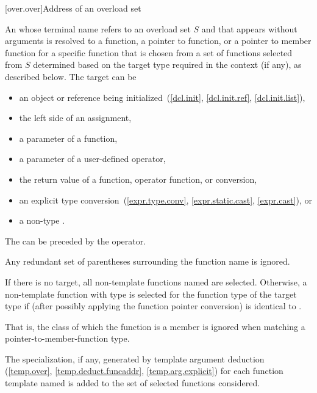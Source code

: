 %

[over.over]{Address of an overload set}%
%

\pnum
An 
whose terminal name refers to an overload set $S$ and
that appears without arguments
is resolved to
a function,
a pointer to function, or
a pointer to member function
for a specific function
that is chosen from a set of functions selected from $S$
determined based on the target type required in the context (if any),
as described below.
The target can be
\begin{itemize}
\item
an object or reference being initialized~(\ref{dcl.init}, \ref{dcl.init.ref},
\ref{dcl.init.list}),
\item
the left side of an assignment,
\item
a parameter of a function,
\item
a parameter of a user-defined operator,
\item
the return value of a function, operator function, or conversion,
\item
an explicit type conversion~(\ref{expr.type.conv}, \ref{expr.static.cast},
\ref{expr.cast}), or
\item
a non-type
.
\end{itemize}
The  can be preceded by the \tcode{\&} operator.
\begin{note}
Any redundant set of parentheses surrounding the function name is
ignored.
\end{note}

\pnum
If there is no target, all non-template functions named are selected.
Otherwise, a non-template function with type 
is selected for the function type  of the target type
if 
(after possibly applying the function pointer conversion)
is identical to .
\begin{note}
That is, the class of which the function is a member is ignored when matching a
pointer-to-member-function type.
\end{note}

\pnum
The specialization, if any, generated by template argument deduction
(\ref{temp.over}, \ref{temp.deduct.funcaddr}, \ref{temp.arg.explicit})
for each function template named
is added to the set of selected functions considered.

